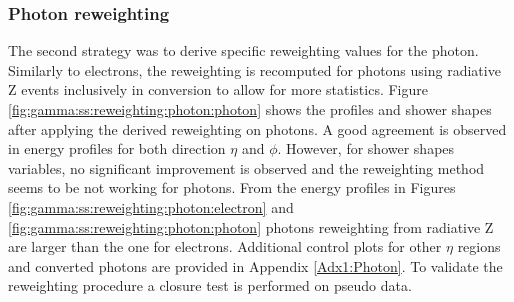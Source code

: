 \subsubsection{Photon reweighting}
The second strategy was to derive specific reweighting values for the photon. Similarly to electrons, the reweighting is recomputed for photons using radiative Z events inclusively in conversion to allow for more statistics. Figure \ref{fig:gamma:ss:reweighting:photon:photon} shows the profiles and shower shapes after applying the derived reweighting on photons. A good agreement is observed in energy profiles for both direction $\eta$ and $\phi$. However, for shower shapes variables, no significant improvement is observed and the reweighting method seems to be not working for photons. From the energy profiles in Figures \ref{fig:gamma:ss:reweighting:photon:electron} and \ref{fig:gamma:ss:reweighting:photon:photon} photons reweighting from radiative Z are larger than the one for electrons. Additional control plots for other $\eta$ regions and converted photons are provided in Appendix \ref{Adx1:Photon}. To validate the reweighting procedure a closure test is performed on pseudo data.
